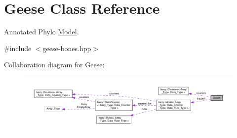 \hypertarget{class_geese}{}\section{Geese Class Reference}
\label{class_geese}


Annotated Phylo \hyperlink{class_model}{Model}.  




{\ttfamily \#include $<$geese-\/bones.\+hpp$>$}



Collaboration diagram for Geese\+:\nopagebreak
\begin{figure}[H]
\begin{center}
\leavevmode
\includegraphics[width=350pt]{class_geese__coll__graph}
\end{center}
\end{figure}
